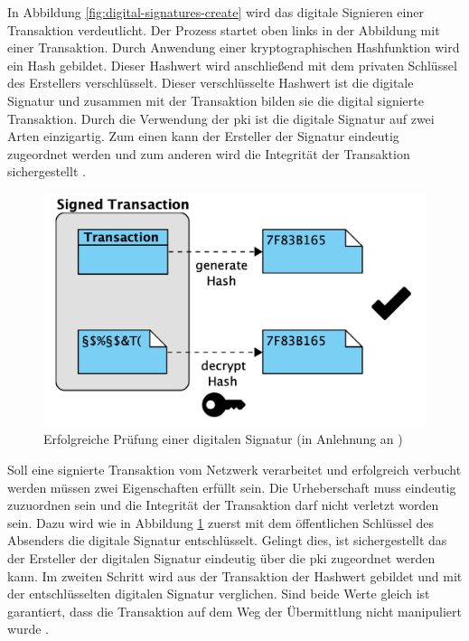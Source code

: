 In Abbildung \ref{fig:digital-signatures-create} wird das digitale Signieren einer Transaktion verdeutlicht. Der Prozess startet oben links in der Abbildung mit einer Transaktion. Durch Anwendung einer kryptographischen Hashfunktion wird ein Hash gebildet. Dieser Hashwert wird anschließend mit dem privaten Schlüssel des Erstellers verschlüsselt. Dieser verschlüsselte Hashwert ist die digitale Signatur und zusammen mit der Transaktion bilden sie die digital signierte Transaktion. Durch die Verwendung der \ac{pki} ist die digitale Signatur auf zwei Arten einzigartig. Zum einen kann der Ersteller der Signatur eindeutig zugeordnet werden und zum anderen wird die Integrität der Transaktion sichergestellt \citep{Drescher2017}.

\begin{figure}[H]
	\centering
	\includegraphics[width=0.7\linewidth]{pictures/digital-signatures-validate-positive}
	\caption[Prüfen einer digitalen Signatur]{Erfolgreiche Prüfung einer digitalen Signatur (in Anlehnung an \citet{Drescher2017})}
	\label{fig:digital-signatures-validate-positive}
\end{figure}

Soll eine signierte Transaktion vom Netzwerk verarbeitet und erfolgreich verbucht werden müssen zwei Eigenschaften erfüllt sein. Die Urheberschaft muss eindeutig zuzuordnen sein und die Integrität der Transaktion darf nicht verletzt worden sein. Dazu wird wie in Abbildung \ref{fig:digital-signatures-validate-positive} zuerst mit dem öffentlichen Schlüssel des Absenders die digitale Signatur entschlüsselt. Gelingt dies, ist sichergestellt das der Ersteller der digitalen Signatur eindeutig über die \ac{pki} zugeordnet werden kann. Im zweiten Schritt wird aus der Transaktion der Hashwert gebildet und mit der entschlüsselten digitalen Signatur verglichen. Sind beide Werte gleich ist garantiert, dass die Transaktion auf dem Weg der Übermittlung nicht manipuliert wurde \citep{Drescher2017}.

